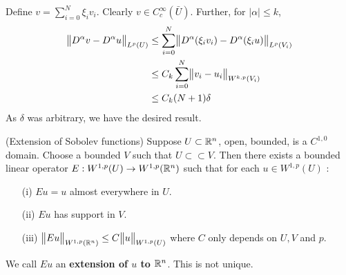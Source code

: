 \documentclass[10pt,a4paper]{report}
\newenvironment{proof}
{\begin{changemargin}{1cm}{0.5cm} 
	}%
	{\end{changemargin}
}
\begin{document}
\begin{proof}
\begin{itemize}
\quad Define $v = \sum_{i=0}^N \xi_i v_i$. Clearly $v \in C^{\infty}_c(\bar{U})$. Further, for $|\alpha|\leq k$,
\begin{align*}
\bigl\lVert D^{\alpha}v- D^{\alpha}u\bigr\rVert_{L^p(U)} &\leq \sum_{i=0}^N \bigl\lVert D^{\alpha}(\xi_i v_i) - D^{\alpha}(\xi_i u)\bigr\rVert_{L^p(V_i)} \\
&\leq C_k \sum_{i=0}^N \bigl\lVert v_i - u_i\bigr\rVert_{W^{k,p}(V_i)} \\
&\leq C_k (N+1)\delta
\end{align*}
As $\delta$ was arbitrary, we have the desired result.
\end{itemize}

\eop
\end{proof}
\s

\thm (Extension of Sobolev functions) Suppose $U\subset \mathbb{R}^n$, open, bounded, is a $C^{1,0}$ domain. Choose a bounded $V$ such that $U \subset\subset V$. Then there exists a bounded linear operator $E : W^{1,p}(U) \rightarrow W^{1,p}(\mathbb{R}^n)$ such that for each $u \in W^{1,p}(U)$ :
\begin{itemize}
\item[(i)] $Eu =u$ almost everywhere in $U$.
\item[(ii)] $Eu$ has support in $V$.
\item[(iii)] $\bigl\lVert Eu\bigr\rVert_{W^{1,p}(\mathbb{R}^n)} \leq C \bigl\lVert u\bigr\rVert_{W^{1,p}(U)}$ where $C$ only depends on $U,V$ and $p$.
\end{itemize}
\s

We call $Eu$ an \textbf{extension of $u$ to $\mathbb{R}^n$}. This is not unique.
\s
\end{document}
